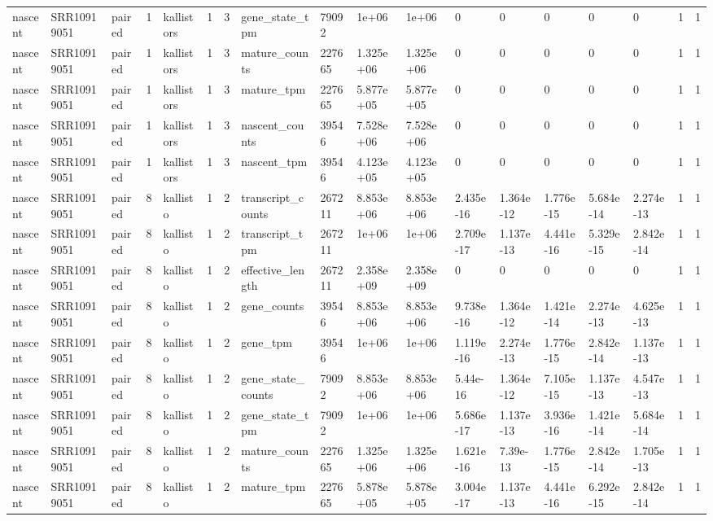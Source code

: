 \begin{tabular}{llllllllllllllllll}
nascent & SRR10919051 & paired & 1 & kallistors & 1 & 3 & gene\_state\_tpm & 79092 & 1e+06 & 1e+06 & 0 & 0 & 0 & 0 & 0 & 1 & 1 \\
nascent & SRR10919051 & paired & 1 & kallistors & 1 & 3 & mature\_counts & 227665 & 1.325e+06 & 1.325e+06 & 0 & 0 & 0 & 0 & 0 & 1 & 1 \\
nascent & SRR10919051 & paired & 1 & kallistors & 1 & 3 & mature\_tpm & 227665 & 5.877e+05 & 5.877e+05 & 0 & 0 & 0 & 0 & 0 & 1 & 1 \\
nascent & SRR10919051 & paired & 1 & kallistors & 1 & 3 & nascent\_counts & 39546 & 7.528e+06 & 7.528e+06 & 0 & 0 & 0 & 0 & 0 & 1 & 1 \\
nascent & SRR10919051 & paired & 1 & kallistors & 1 & 3 & nascent\_tpm & 39546 & 4.123e+05 & 4.123e+05 & 0 & 0 & 0 & 0 & 0 & 1 & 1 \\
nascent & SRR10919051 & paired & 8 & kallisto & 1 & 2 & transcript\_counts & 267211 & 8.853e+06 & 8.853e+06 & 2.435e-16 & 1.364e-12 & 1.776e-15 & 5.684e-14 & 2.274e-13 & 1 & 1 \\
nascent & SRR10919051 & paired & 8 & kallisto & 1 & 2 & transcript\_tpm & 267211 & 1e+06 & 1e+06 & 2.709e-17 & 1.137e-13 & 4.441e-16 & 5.329e-15 & 2.842e-14 & 1 & 1 \\
nascent & SRR10919051 & paired & 8 & kallisto & 1 & 2 & effective\_length & 267211 & 2.358e+09 & 2.358e+09 & 0 & 0 & 0 & 0 & 0 & 1 & 1 \\
nascent & SRR10919051 & paired & 8 & kallisto & 1 & 2 & gene\_counts & 39546 & 8.853e+06 & 8.853e+06 & 9.738e-16 & 1.364e-12 & 1.421e-14 & 2.274e-13 & 4.625e-13 & 1 & 1 \\
nascent & SRR10919051 & paired & 8 & kallisto & 1 & 2 & gene\_tpm & 39546 & 1e+06 & 1e+06 & 1.119e-16 & 2.274e-13 & 1.776e-15 & 2.842e-14 & 1.137e-13 & 1 & 1 \\
nascent & SRR10919051 & paired & 8 & kallisto & 1 & 2 & gene\_state\_counts & 79092 & 8.853e+06 & 8.853e+06 & 5.44e-16 & 1.364e-12 & 7.105e-15 & 1.137e-13 & 4.547e-13 & 1 & 1 \\
nascent & SRR10919051 & paired & 8 & kallisto & 1 & 2 & gene\_state\_tpm & 79092 & 1e+06 & 1e+06 & 5.686e-17 & 1.137e-13 & 3.936e-16 & 1.421e-14 & 5.684e-14 & 1 & 1 \\
nascent & SRR10919051 & paired & 8 & kallisto & 1 & 2 & mature\_counts & 227665 & 1.325e+06 & 1.325e+06 & 1.621e-16 & 7.39e-13 & 1.776e-15 & 2.842e-14 & 1.705e-13 & 1 & 1 \\
nascent & SRR10919051 & paired & 8 & kallisto & 1 & 2 & mature\_tpm & 227665 & 5.878e+05 & 5.878e+05 & 3.004e-17 & 1.137e-13 & 4.441e-16 & 6.292e-15 & 2.842e-14 & 1 & 1 \\

\end{tabular}
